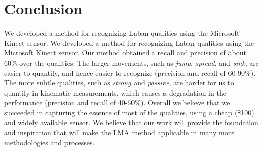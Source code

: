 \documentclass[journal]{journal}
\begin{document}
\section{Conclusion}
We developed a method for recognizing Laban qualities using the Microsoft Kinect
sensor. 
We developed a method for recognizing Laban qualities using the Microsoft
Kinect sensor.
Our method obtained a recall and precision of about 60\% over the qualities.
The larger movements, such as \textit{jump}, \textit{spread}, and \textit{sink},
are easier to quantify, and hence  easier to recognize (precision and recall of 60-90\%).
The more subtle qualities, such as \textit{strong} and \textit{passive},
are harder for us to quantify in kinematic measurements, which causes a degradation in
the performance (precision and recall of 40-60\%).
Overall we believe that we succeeded in capturing the essence of most of the qualities,
using a cheap (\$100) and widely available sensor.
We believe that our work will provide the foundation and inspiration that will make the LMA method
applicable in many more methodologies and processes.





%



\ifCLASSOPTIONcaptionsoff
  \newpage
\fi
\end{document}
